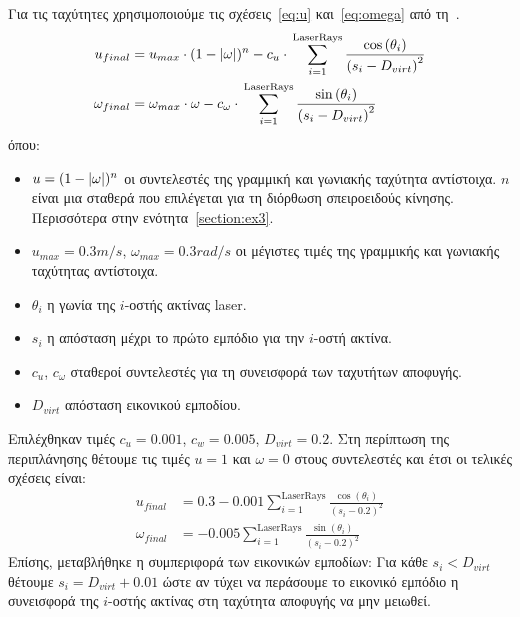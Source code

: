Για τις ταχύτητες χρησιμοποιούμε τις σχέσεις~\ref{eq:u} και~\ref{eq:omega} από τη~\cite{etsardou-phd}.
\begin{align}
    u_{final}      & = u_{max} \cdot{} (1 - \left\lvert\omega\right\rvert)^n - c_u \cdot{} \sum_{i=1}^{\text{LaserRays}} \frac{\cos{\left(\theta_i\right)}}{\left(s_i-D_{virt}\right)^2}\label{eq:u}   \\
    \omega_{final} & = \omega_{max} \cdot{} \omega - c_{\omega} \cdot{} \sum_{i=1}^{\text{LaserRays}} \frac{\sin\left(\theta_i\right)}{\left(s_i - D_{virt}\right)^2}\label{eq:omega}
\end{align}
όπου:
\begin{itemize}
    \item $u = (1 - \left\lvert\omega\right\rvert)^n$ οι συντελεστές της γραμμική και γωνιακής ταχύτητα αντίστοιχα.
          $n$ είναι μια σταθερά που επιλέγεται για τη διόρθωση σπειροειδούς κίνησης.
          Περισσότερα στην ενότητα~\ref{section:ex3}.
    \item $u_{max} = 0.3 m/s$, $\omega_{max} = 0.3 rad/s$ οι μέγιστες τιμές της γραμμικής και γωνιακής ταχύτητας αντίστοιχα.
    \item $\theta_i$ η γωνία της $i$-οστής ακτίνας laser.
    \item $s_i$ η απόσταση μέχρι το πρώτο εμπόδιο για την $i$-οστή ακτίνα.
    \item $c_u$, $c_{\omega}$ σταθεροί συντελεστές για τη συνεισφορά των ταχυτήτων αποφυγής.
    \item $D_{virt}$ απόσταση εικονικού εμποδίου.
\end{itemize}
Επιλέχθηκαν τιμές $c_u = 0.001$, $c_w = 0.005$, $D_{virt} = 0.2$.
Στη περίπτωση της περιπλάνησης θέτουμε τις τιμές $u = 1$ και $\omega = 0$ στους συντελεστές και έτσι οι τελικές σχέσεις είναι:
\begin{align}
    u_{final}      & = 0.3 - 0.001 \sum_{i=1}^{\text{LaserRays}} \frac{\cos{\left(\theta_i\right)}}{\left(s_i-0.2\right)^2} \\
    \omega_{final} & = -0.005 \sum_{i=1}^{\text{LaserRays}} \frac{\sin\left(\theta_i\right)}{\left(s_i - 0.2\right)^2}
\end{align}
Επίσης, μεταβλήθηκε η συμπεριφορά των εικονικών εμποδίων:
Για κάθε $s_i < D_{virt}$ θέτουμε $s_i = D_{virt} + 0.01$ ώστε αν τύχει να περάσουμε το εικονικό εμπόδιο η συνεισφορά της $i$-οστής ακτίνας στη ταχύτητα αποφυγής να μην μειωθεί\label{d-virt}.
